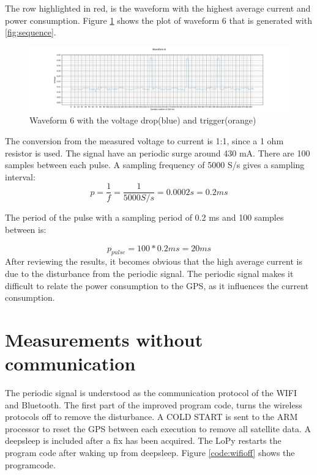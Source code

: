 The row highlighted in red, is the waveform with the highest average current and power consumption.
Figure \ref{fig:startup_intial} shows the plot of waveform 6 that is generated with \ref{fig:sequence}.


 \begin{figure}[H]
\centering
\includegraphics[width=18 cm]{Project_Report/Images/startup_intial.PNG}
\caption{Waveform 6 with the voltage drop(blue) and trigger(orange)}
\label{fig:startup_intial}
\end{figure}

 The conversion from the measured voltage to current is 1:1, since a 1 ohm resistor is used. The signal have an periodic surge around 430 mA. There are 100 samples between each pulse. A sampling frequency of 5000 S/s gives a sampling interval:
 \begin{equation}
     p= \frac{1}{f} = \frac{1}{5000S/s}= 0.0002 s = 0.2 ms 
 \end{equation}
 
 The period of the pulse with a sampling period of 0.2 ms and 100 samples between is:
 
 \begin{equation}
     p_{pulse} = 100*0.2 ms = 20 ms
 \end{equation}
 After reviewing the results, it becomes obvious that the high average current is due to the disturbance from the periodic signal. The periodic signal makes it difficult to relate the power consumption to the GPS, as it influences the current consumption.


\section{Measurements without communication}

The periodic signal is understood as the communication protocol of the WIFI and Bluetooth. The first part of the improved program code, turns the wireless protocols off to remove the disturbance. A COLD START is sent to the ARM processor to reset the GPS between each execution to remove all satellite data. A deepsleep is included after a fix has been acquired. The LoPy restarts the program code after waking up from deepsleep. Figure \ref{code:wifioff} shows the programcode.

